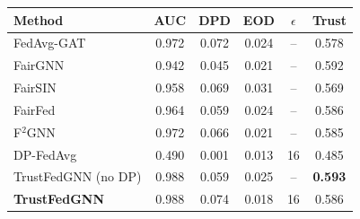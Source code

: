 \begin{tabular}{lccccc}
\toprule
Method & AUC & DPD & EOD & $\epsilon$ & Trust \\
\midrule
FedAvg-GAT & 0.972 & 0.072 & 0.024 & -- & 0.578 \\
FairGNN & 0.942 & 0.045 & 0.021 & -- & 0.592 \\
FairSIN & 0.958 & 0.069 & 0.031 & -- & 0.569 \\
FairFed & 0.964 & 0.059 & 0.024 & -- & 0.586 \\
F$^2$GNN & 0.972 & 0.066 & 0.021 & -- & 0.585 \\
DP-FedAvg & 0.490 & 0.001 & 0.013 & 16 & 0.485 \\
TrustFedGNN (no DP) & 0.988 & 0.059 & 0.025 & -- & \textbf{0.593} \\
\textbf{TrustFedGNN} & 0.988 & 0.074 & 0.018 & 16 & 0.586 \\
\bottomrule
\end{tabular}